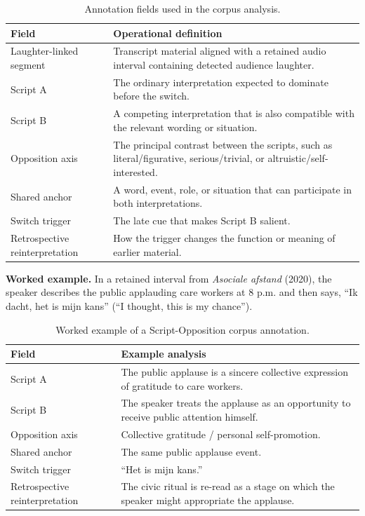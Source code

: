 \documentclass[11pt]{article}
\begin{document}
\begin{table}[t]
\centering
\caption{Annotation fields used in the corpus analysis.}\label{tab:annotation-schema}
\scriptsize\begin{tabularx}{\textwidth}{YY}
\toprule\noalign{}
Field & Operational definition \\
\midrule\noalign{}

Laughter-linked segment & Transcript material aligned with a retained audio interval containing detected audience laughter. \\
Script A & The ordinary interpretation expected to dominate before the switch. \\
Script B & A competing interpretation that is also compatible with the relevant wording or situation. \\
Opposition axis & The principal contrast between the scripts, such as literal/figurative, serious/trivial, or altruistic/self-interested. \\
Shared anchor & A word, event, role, or situation that can participate in both interpretations. \\
Switch trigger & The late cue that makes Script B salient. \\
Retrospective reinterpretation & How the trigger changes the function or meaning of earlier material. \\
\bottomrule
\end{tabularx}\end{table}

\textbf{Worked example.} In a retained interval from \emph{Asociale afstand} (2020), the speaker describes the public applauding care workers at 8 p.m. and then says, ``Ik dacht, het is mijn kans'' (``I thought, this is my chance'').

\begin{table}[t]
\centering
\caption{Worked example of a Script-Opposition corpus annotation.}\label{tab:annotation-example}
\scriptsize\begin{tabularx}{\textwidth}{YY}
\toprule\noalign{}
Field & Example analysis \\
\midrule\noalign{}

Script A & The public applause is a sincere collective expression of gratitude to care workers. \\
Script B & The speaker treats the applause as an opportunity to receive public attention himself. \\
Opposition axis & Collective gratitude / personal self-promotion. \\
Shared anchor & The same public applause event. \\
Switch trigger & ``Het is mijn kans.'' \\
Retrospective reinterpretation & The civic ritual is re-read as a stage on which the speaker might appropriate the applause. \\
\bottomrule
\end{tabularx}\end{table}
\end{document}
